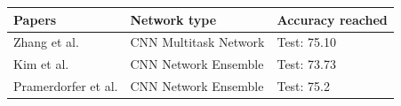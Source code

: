 \documentclass[10pt,twocolumn,letterpaper]{article}
\begin{document}
\begin{table}[h]
   \begin{center}
      \begin{tabular}{|C{2.2cm}|C{2.2cm}|C{1.6cm}|}
         \hline
         Papers                         & Network type          & Accuracy reached \\
         \hline\hline
         Zhang et al. \cite{Zhang}      & CNN Multitask Network & Test: 75.10      \\\hline
         Kim et al. \cite{Kim}          & CNN Network Ensemble  & Test: 73.73      \\\hline
         Pramerdorfer et al. \cite{147} & CNN Network Ensemble  & Test: 75.2       \\
         \hline
      \end{tabular}
   \end{center}
   \label{mytable}
\end{table}
\end{document}
